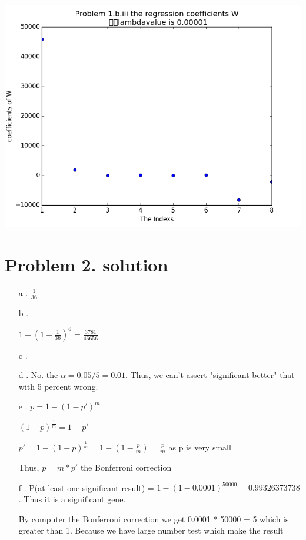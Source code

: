 \documentclass[11pt]{article}
\begin{document}
\begin{itemize}
\begin{itemize}
\includegraphics[scale=0.6]{q1}

\end{itemize}
\end{itemize}


\section*{Problem 2. solution}
\begin{itemize}

\item[a].
$\frac{1}{36}$

\item[b].

$1 - (1 - \frac{1}{36}) ^ 6 = \frac{3781}{46656}$

\item[c].

\item[d].
No. the $\alpha = 0.05 /5 = 0.01$. Thus, we can't assert "significant better" that with 5 percent wrong. 

\item[e].
$p = 1 - (1 - {p}')^m$

$ (1 - p)^{\frac{1}{m}} = 1 - {p}'$ 

$ {p}' = 1 - (1 - p)^{\frac{1}{m}} = 1 - (1 - \frac{p}{m}) = \frac{p}{m}$ as p is very small

Thus, $p = m * {p}'$ the Bonferroni correction

\item[f].
P(at least one significant result) = $1 - (1 - 0.0001)^{50000} = 0.99326373738$. Thus it is a significant gene. 

By computer the Bonferroni correction we get 0.0001 * 50000 = 5 which is greater than 1. Because we have large number test which make the result 


\end{itemize}
\end{document}

